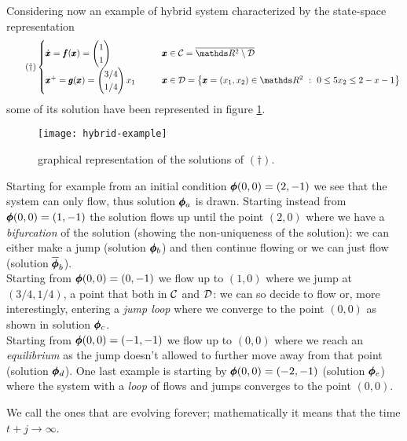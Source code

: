 	Considering now an example of hybrid system characterized by the state-space representation
	\[ \tag{$\dagger$}\begin{cases}
		\dx = \vet f(\x) = \vector{1 \\ 1} \qquad & \x \in \fset = \overline{\mathds R^2\setminus \jset} \\
		\xp = \vet g(\x) = \vector{3/4 \\ 1/4} x_1 \qquad & \x \in \jset = \big\{ \x=(x_1,x_2) \in \mathds R^2 \ : \ 0 \leq 5x_2 \leq 2-x-1 \big\}
	\end{cases} \]
	some of its solution have been represented in figure \ref{fig:hyb:example}.
	\begin{figure}[bt]
		\centering \texttt{[image: hybrid-example]}
		\caption{graphical  representation of the solutions of $(\dagger)$.} \label{fig:hyb:example}
	\end{figure}
	Starting for example from an initial condition $\pmb{\phi}(0,0)=(2,-1)$ we see that the system can only flow, thus solution $\pmb{\phi}_a$ is drawn. Starting instead from $\pmb{\phi}(0,0)=(1,-1)$ the solution flows up until the point $(2,0)$ where we have a \textit{bifurcation} of the solution (showing the non-uniqueness of the solution): we can either make a jump (solution $\pmb{\phi}_b$) and then continue flowing or we can just flow (solution $\overline{\pmb{\phi}}_b$).\\
	Starting from $\pmb{\phi}(0,0) = (0,-1)$ we flow up to $(1,0)$ where we jump at $(3/4,1/4)$, a point that both in $\mathcal C$ and $\mathcal D$: we can so decide to flow or, more interestingly, entering a \textit{jump loop} where we converge to the point $(0,0)$ as shown in solution $\pmb{\phi}_c$. \\
	Starting from $\pmb{\phi}(0,0) = (-1,-1)$ we flow up to $(0,0)$ where we reach an \textit{equilibrium} as the jump doesn't allowed to further move away from that point (solution $\pmb{\phi}_d$). One last example is starting by $\pmb{\phi}(0,0) = (-2,-1)$ (solution $\pmb{\phi}_e$) where the system with a \textit{loop} of flows and jumps converges to the point $(0,0)$.
	
	We call  the ones that are evolving forever; mathematically it means that the time $t+j\rightarrow \infty$.

